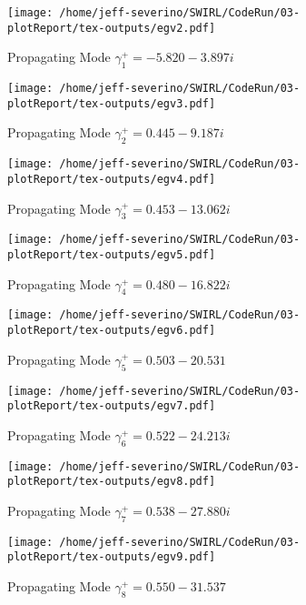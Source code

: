 \documentclass[a4paper]{article}
\begin{document}
 \begin{figure}
     \centering
     \texttt{[image: /home/jeff-severino/SWIRL/CodeRun/03-plotReport/tex-outputs/egv2.pdf]}
     \caption{Propagating Mode $\gamma^+_1 = -5.820-3.897i$}
     \label{fig:3} 
 \end{figure}


 \begin{figure}
     \centering
     \texttt{[image: /home/jeff-severino/SWIRL/CodeRun/03-plotReport/tex-outputs/egv3.pdf]}
     \caption{Propagating Mode $\gamma^+_2 = 0.445-9.187i$}
     \label{fig:4} 
 \end{figure}


 \begin{figure}
     \centering
     \texttt{[image: /home/jeff-severino/SWIRL/CodeRun/03-plotReport/tex-outputs/egv4.pdf]}
     \caption{Propagating Mode $\gamma^+_3 = 0.453-13.062i$}
     \label{fig:5} 
 \end{figure}


 \begin{figure}
     \centering
     \texttt{[image: /home/jeff-severino/SWIRL/CodeRun/03-plotReport/tex-outputs/egv5.pdf]}
     \caption{Propagating Mode $\gamma^+_4 = 0.480 - 16.822i$}
     \label{fig:6} 
 \end{figure}


 \begin{figure}
     \centering
     \texttt{[image: /home/jeff-severino/SWIRL/CodeRun/03-plotReport/tex-outputs/egv6.pdf]}
     \caption{Propagating Mode $\gamma^+_5 = 0.503 - 20.531$}
     \label{fig:7} 
 \end{figure}


 \begin{figure}
     \centering
     \texttt{[image: /home/jeff-severino/SWIRL/CodeRun/03-plotReport/tex-outputs/egv7.pdf]}
     \caption{Propagating Mode $\gamma^+_6 = 0.522 - 24.213i$}
     \label{fig:8} 
 \end{figure}

 \begin{figure}
     \centering
     \texttt{[image: /home/jeff-severino/SWIRL/CodeRun/03-plotReport/tex-outputs/egv8.pdf]}
     \caption{Propagating Mode $\gamma^+_7 = 0.538 - 27.880i$}
     \label{fig:9} 
 \end{figure}


 \begin{figure}
     \centering
     \texttt{[image: /home/jeff-severino/SWIRL/CodeRun/03-plotReport/tex-outputs/egv9.pdf]}
     \caption{Propagating Mode $\gamma^+_8 = 0.550 - 31.537$}
     \label{fig:10} 
 \end{figure}
\end{document}
